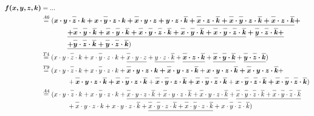 \documentclass{article}
\newcommand*{\oline}[1]{\overline{#1\mathstrut}}
\newcommand{\bigspace}{\quad\quad\quad\quad}
\begin{document}
\begin{align*}
  \bm{f(x,y,z,k)} &= ...\\
  &\overset{A6}{=} (\bm{x \cdot y \cdot \oline{z} \cdot k + x \cdot \oline{y} \cdot z \cdot k + \oline{x} \cdot y \cdot z + y \cdot z \cdot \oline{k} + \underline{\oline{x} \cdot z \cdot \oline{k} + \oline{x} \cdot \oline{y} \cdot z \cdot \oline{k} + \oline{x} \cdot z \cdot \oline{k}} +}\\
  &\bigspace \bm{\underline{+ \oline{x} \cdot \oline{y} \cdot \oline{k} + \oline{x} \cdot \oline{y} \cdot \oline{k} + \oline{x} \cdot \oline{y} \cdot \oline{z} \cdot \oline{k} + \oline{x} \cdot \oline{y} \cdot \oline{k} + \oline{x} \cdot \oline{y} \cdot \oline{z} \cdot \oline{k}} + \underline{\oline{y} \cdot \oline{z} \cdot \oline{k} +}}\\
  &\bigspace \bm{\underline{+ \oline{y} \cdot \oline{z} \cdot \oline{k} + \oline{y} \cdot \oline{z} \cdot \oline{k}}})\\
  &\overset{T4}{=} (x \cdot y \cdot \oline{z} \cdot k + x \cdot \oline{y} \cdot z \cdot k + \underline{\oline{x} \cdot y \cdot z} + \underline{y \cdot z \cdot \oline{k}} + \underline{\bm{\oline{x} \cdot z \cdot \oline{k}}} + \underline{\bm{\oline{x} \cdot \oline{y} \cdot \oline{k}}} + \underline{\bm{\oline{y} \cdot \oline{z} \cdot \oline{k}}})\\
  &\overset{T9}{=} (x \cdot y \cdot \oline{z} \cdot k + x \cdot \oline{y} \cdot z \cdot k + \bm{\oline{x} \cdot y \cdot z \cdot k + \oline{x} \cdot y \cdot z \cdot \oline{k}} + \bm{x \cdot y \cdot z \cdot \oline{k} + \oline{x} \cdot y \cdot z \cdot \oline{k}} +\\
  &\bigspace + \bm{\oline{x} \cdot y \cdot z \cdot \oline{k} + \oline{x} \cdot \oline{y} \cdot z \cdot \oline{k}} + \bm{\oline{x} \cdot \oline{y} \cdot z \cdot \oline{k} + \oline{x} \cdot \oline{y} \cdot \oline{z} \cdot \oline{k}} + \bm{x \cdot \oline{y} \cdot \oline{z} \cdot \oline{k} + \oline{x} \cdot \oline{y} \cdot \oline{z} \cdot \oline{k}})\\
  &\overset{A4}{=} (x \cdot y \cdot \oline{z} \cdot k + x \cdot \oline{y} \cdot z \cdot k + \underline{\oline{x} \cdot y \cdot z \cdot \oline{k} + \oline{x} \cdot y \cdot z \cdot \oline{k} + \oline{x} \cdot y \cdot z \cdot \oline{k}} + \underline{\oline{x} \cdot \oline{y} \cdot \oline{z} \cdot \oline{k} + \oline{x} \cdot \oline{y} \cdot \oline{z} \cdot \oline{k}}\\
  &\bigspace + \oline{x} \cdot y \cdot z \cdot k + x \cdot y \cdot z \cdot \oline{k} + \underline{\oline{x} \cdot \oline{y} \cdot z \cdot \oline{k} + \oline{x} \cdot \oline{y} \cdot z \cdot \oline{k}} + x \cdot \oline{y} \cdot \oline{z} \cdot \oline{k})\\

\end{align*}
\end{document}
